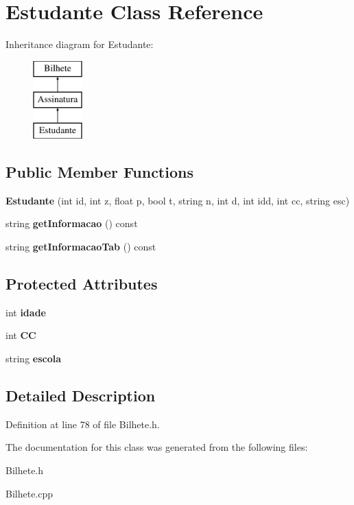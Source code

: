 \hypertarget{classEstudante}{}\section{Estudante Class Reference}
\label{classEstudante}
Inheritance diagram for Estudante\+:\begin{figure}[H]
\begin{center}
\leavevmode
\includegraphics[height=3.000000cm]{classEstudante}
\end{center}
\end{figure}
\subsection*{Public Member Functions}
\begin{DoxyCompactItemize}
\item 
\mbox{\label{classEstudante_a8096793271919470811ad2ab81260615}} 
{\bfseries Estudante} (int id, int z, float p, bool t, string n, int d, int idd, int cc, string esc)
\item 
\mbox{\label{classEstudante_a0e59577adcbb49904f6144891e75206f}} 
string {\bfseries get\+Informacao} () const
\item 
\mbox{\label{classEstudante_ac341d8a87794c59d9d3b952a15e8afea}} 
string {\bfseries get\+Informacao\+Tab} () const
\end{DoxyCompactItemize}
\subsection*{Protected Attributes}
\begin{DoxyCompactItemize}
\item 
\mbox{\label{classEstudante_aecafe096d03f3ab5e4edce9243e846e5}} 
int {\bfseries idade}
\item 
\mbox{\label{classEstudante_a4db2f67993f572c9b1fafb79dadad6e4}} 
int {\bfseries CC}
\item 
\mbox{\label{classEstudante_a5e0849e5c0ad1886c3a35441cf8101a9}} 
string {\bfseries escola}
\end{DoxyCompactItemize}


\subsection{Detailed Description}


Definition at line 78 of file Bilhete.\+h.



The documentation for this class was generated from the following files\+:\begin{DoxyCompactItemize}
\item 
Bilhete.\+h\item 
Bilhete.\+cpp\end{DoxyCompactItemize}
